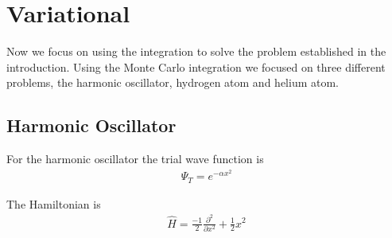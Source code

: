 
\section{Variational}
 Now we focus on using the integration to solve the problem established in the introduction.
 Using the Monte Carlo integration we focused on three different problems, the harmonic oscillator,
 hydrogen atom and helium atom.

\subsection{Harmonic Oscillator}
  For the harmonic oscillator the trial wave function is
  \begin{align}
    \Psi_T = e^{-\alpha x^2}
  \end{align}

  The Hamiltonian is
  \begin{align}
    \hat{H} = \frac{-1}{2}\frac{\partial^2}{ \partial x^2} + \frac{1}{2} x^2
  \end{align}
